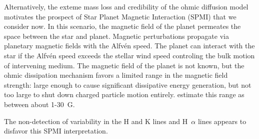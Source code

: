 \documentclass[twocolumn]{aastex631}
\begin{document}
Alternatively, the exteme mass loss and credibility of the ohmic diffusion model motivates the prospect of Star Planet Magnetic Interaction (SPMI) that we consider now.  In this scenario, the magnetic field of the planet permeates the space between the star and planet.  Magnetic perturbations propagate via planetary magnetic fields with the Alfv\'en speed.  The planet can interact with the star if the Alfv\'en speed exceeds the stellar wind speed controling the bulk motion of intervening medium.  The magnetic field of the planet is not known, but the ohmic dissipation mechanism favors a limited range in the magnetic field strength: large enough to cause significant dissipative energy generation, but not too large to shut down charged particle motion entirely.  \citet{2011ApJ...738....1B} estimate this range as between about 1-30~G.

The non-detection of variability in the  H and K lines and H~$\alpha$ lines appears to disfavor this SPMI interpretation.





\end{document}

